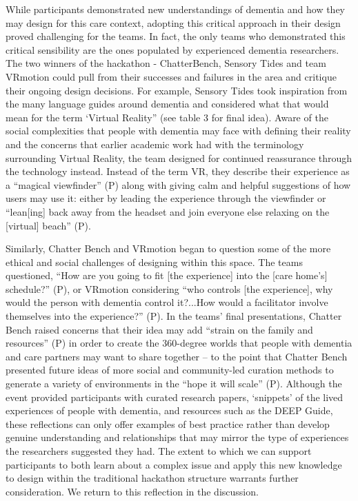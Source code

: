 While participants demonstrated new understandings of dementia and how they may design for this care context, adopting this critical approach in their design proved challenging for the teams. In fact, the only teams who demonstrated this critical sensibility are the ones populated by experienced dementia researchers. The two winners of the hackathon - ChatterBench, Sensory Tides and team VRmotion could pull from their successes and failures in the area and critique their ongoing design decisions. For example, Sensory Tides took inspiration from the many language guides around dementia and considered what that would mean for the term ‘Virtual Reality” (see table 3 for final idea). Aware of the social complexities that people with dementia may face with defining their reality and the concerns that earlier academic work had with the terminology surrounding Virtual Reality, the team designed for continued reassurance through the technology instead. Instead of the term VR, they describe their experience as a “magical viewfinder” (P) along with giving calm and helpful suggestions of how users may use it: either by leading the experience through the viewfinder or “lean[ing] back away from the headset and join everyone else relaxing on the [virtual] beach” (P). 

Similarly, Chatter Bench and VRmotion began to question some of the more ethical and social challenges of designing within this space. The teams questioned, “How are you going to fit [the experience] into the [care home’s] schedule?” (P), or VRmotion considering “who controls [the experience], why would the person with dementia control it?...How would a facilitator involve themselves into the experience?” (P). In the teams’ final presentations, Chatter Bench raised concerns that their idea may add “strain on the family and resources” (P) in order to create the 360-degree worlds that people with dementia and care partners may want to share together – to the point that Chatter Bench presented future ideas of more social and community-led curation methods to generate a variety of environments in the “hope it will scale” (P). Although the event provided participants with curated research papers, ‘snippets’ of the lived experiences of people with dementia, and resources such as the DEEP Guide, these reflections can only offer examples of best practice rather than develop genuine understanding and relationships that may mirror the type of experiences the researchers suggested they had.  The extent to which we can support participants to both learn about a complex issue and apply this new knowledge to design within the traditional hackathon structure warrants further consideration. We return to this reflection in the discussion. 

